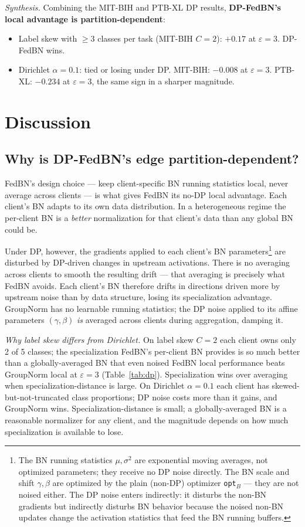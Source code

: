 \documentclass[conference]{IEEEtran}
\newcommand{\code}[1]{\texttt{\small #1}}
\begin{document}
\emph{Synthesis.} Combining the MIT-BIH and PTB-XL DP results, \textbf{DP-FedBN's local advantage is partition-dependent}:
\begin{itemize}
\item Label skew with $\geq 3$ classes per task (MIT-BIH $C{=}2$): $+0.17$ at $\varepsilon{=}3$. DP-FedBN wins.
\item Dirichlet $\alpha{=}0.1$: tied or losing under DP. MIT-BIH: $-0.008$ at $\varepsilon{=}3$. PTB-XL: $-0.234$ at $\varepsilon{=}3$, the same sign in a sharper magnitude.
\end{itemize}

\section{Discussion}\label{sec:discussion}

\subsection{Why is DP-FedBN's edge partition-dependent?}
FedBN's design choice --- keep client-specific BN running statistics local, never average across clients --- is what gives FedBN its no-DP local advantage. Each client's BN adapts to its own data distribution. In a heterogeneous regime the per-client BN is a \emph{better} normalization for that client's data than any global BN could be.

Under DP, however, the gradients applied to each client's BN parameters\footnote{The BN running statistics $\mu, \sigma^2$ are exponential moving averages, not optimized parameters; they receive no DP noise directly. The BN scale and shift $\gamma, \beta$ are optimized by the plain (non-DP) optimizer \code{opt$_B$} --- they are not noised either. The DP noise enters indirectly: it disturbs the non-BN gradients but indirectly disturbs BN behavior because the noised non-BN updates change the activation statistics that feed the BN running buffers.} are disturbed by DP-driven changes in upstream activations. There is no averaging across clients to smooth the resulting drift --- that averaging is precisely what FedBN avoids. Each client's BN therefore drifts in directions driven more by upstream noise than by data structure, losing its specialization advantage. GroupNorm has no learnable running statistics; the DP noise applied to its affine parameters $(\gamma, \beta)$ \emph{is} averaged across clients during aggregation, damping it.

\emph{Why label skew differs from Dirichlet.} On label skew $C{=}2$ each client owns only 2 of 5 classes; the specialization FedBN's per-client BN provides is so much better than a globally-averaged BN that even noised FedBN local performance beats GroupNorm local at $\varepsilon{=}3$ (Table~\ref{tab:dp}). Specialization wins over averaging when specialization-distance is large. On Dirichlet $\alpha{=}0.1$ each client has skewed-but-not-truncated class proportions; DP noise costs more than it gains, and GroupNorm wins. Specialization-distance is small; a globally-averaged BN is a reasonable normalizer for any client, and the magnitude depends on how much specialization is available to lose.
\end{document}
